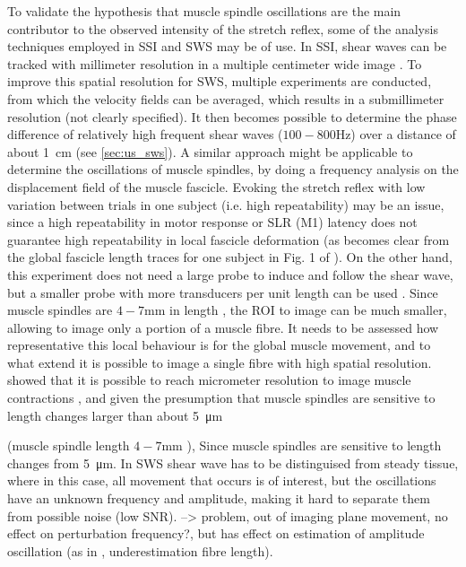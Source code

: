 To validate the hypothesis that muscle spindle oscillations are the main contributor to the observed intensity of the stretch reflex, some of the analysis techniques employed in SSI and SWS may be of use. In SSI, shear waves can be tracked with millimeter resolution in a multiple centimeter wide image \cite{deffieux_shear_2009}. To improve this spatial resolution for SWS, multiple experiments are conducted, from which the velocity fields can be averaged, which results in a submillimeter resolution (not clearly specified). It then becomes possible to determine the phase difference of relatively high frequent shear waves ($100-800$\si{\hertz}) over a distance of about \SI{1}{\centi\meter} (see \autoref{sec:us_sws}). 
A similar approach might be applicable to determine the oscillations of muscle spindles, by doing a frequency analysis on the displacement field of the muscle fascicle. Evoking the stretch reflex with low variation between trials in one subject (i.e. high repeatability) may be an issue, since a high repeatability in motor response or SLR (M1) latency does not guarantee high repeatability in local fascicle deformation (as becomes clear from the global fascicle length traces for one subject in Fig. 1 of \cite{cronin_triceps_2015}). On the other hand, this experiment does not need a large probe to induce and follow the shear wave, but a smaller probe with more transducers per unit length can be used . 
Since muscle spindles are $4-7$\si{\milli\meter} in length \cite{smith_chapter_2007}, the ROI to image can be much smaller, allowing to image only a portion of a muscle fibre. It needs to be assessed how representative this local behaviour is for the global muscle movement, and to what extend it is possible to image a single fibre with high spatial resolution. \citeauthor{deffieux_assessment_2008} showed that it is possible to reach micrometer resolution to image muscle contractions \cite{deffieux_assessment_2008}, and given the presumption that muscle spindles are sensitive to length changes larger than about \SI{5}{\micro\meter} \cite{cronin_triceps_2015}

 (muscle spindle length $4-7$\si{\milli\meter} \cite{smith_chapter_2007}),  Since muscle spindles are sensitive to length changes from \SI{5}{\micro\meter}. 
In SWS shear wave has to be distinguised from steady tissue, where in this case, all movement that occurs is of interest, but the oscillations have an unknown frequency and amplitude, making it hard to separate them from possible noise (low SNR).
--> problem, out of imaging plane movement, no effect on perturbation frequency?, but has effect on estimation of amplitude oscillation (as in \cite{seynnes_ultrasound-based_2014}, underestimation fibre length). 


